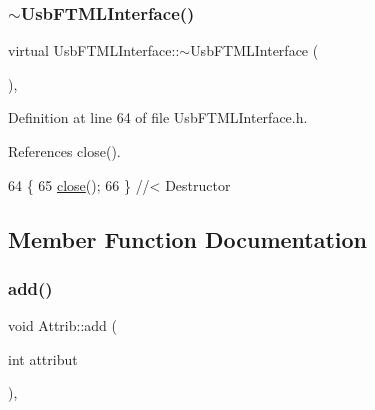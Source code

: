 \mbox{\label{classUsbFTMLInterface_a0bf44726e717235861347e61ac76a799}} 
\subsubsection{\texorpdfstring{$\sim$\+Usb\+F\+T\+M\+L\+Interface()}{~UsbFTMLInterface()}}
{\footnotesize\ttfamily virtual Usb\+F\+T\+M\+L\+Interface\+::$\sim$\+Usb\+F\+T\+M\+L\+Interface (\begin{DoxyParamCaption}{ }\end{DoxyParamCaption})\hspace{0.3cm}{\ttfamily [inline]}, {\ttfamily [virtual]}}



Definition at line 64 of file Usb\+F\+T\+M\+L\+Interface.\+h.



References close().


\begin{DoxyCode}
64                               \{
65     \hyperlink{classUsbFTMLInterface_a1eaa27bd62bc381f60aa837f70a70117}{close}();
66   \} \textcolor{comment}{//< Destructor}
\end{DoxyCode}


\subsection{Member Function Documentation}
\mbox{\label{classAttrib_a235f773af19c900264a190b00a3b4ad7}} 
\subsubsection{\texorpdfstring{add()}{add()}}
{\footnotesize\ttfamily void Attrib\+::add (\begin{DoxyParamCaption}\item[{int}]{attribut }\end{DoxyParamCaption})\hspace{0.3cm}{\ttfamily [inline]}, {\ttfamily [inherited]}}

